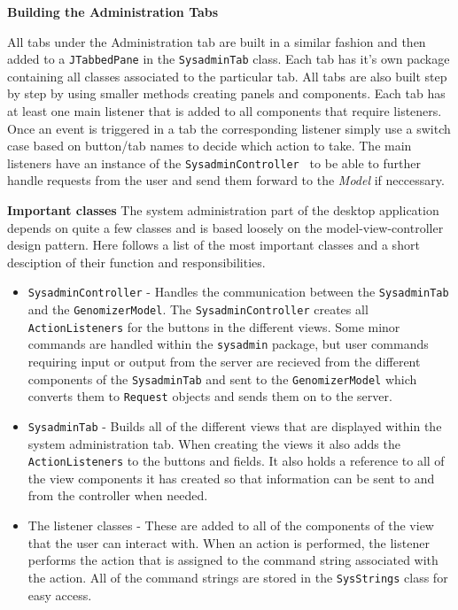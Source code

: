 \textbf{Building the Administration Tabs}


All tabs under the Administration tab are built in a similar fashion and then added to a
\texttt{JTabbedPane} in the \texttt{SysadminTab} class. Each tab has it’s own package containing 
all classes associated to the particular tab. All tabs are also built step by step by 
using smaller methods creating panels and components. Each tab has at least one main 
listener that is added to all components that require listeners. Once an event is triggered 
in a tab the corresponding listener simply use a switch case based on button/tab names 
to decide which action to take. The main listeners have an instance of the \texttt{SysadminController }
to be able to further handle requests from the user and send them forward to the \textit{Model} if neccessary.


\textbf{Important classes}
The system administration part of the desktop application depends on quite a few classes and is based loosely on the model-view-controller design pattern. Here follows a list of the most important classes and a short desciption of their function and responsibilities.
\begin{itemize}
\item \texttt{SysadminController} - Handles the communication between the \texttt{SysadminTab} and the \texttt{GenomizerModel}. The \texttt{SysadminController} creates all \texttt{ActionListeners} for the buttons in the different views. Some minor commands are handled within the \texttt{sysadmin} package, but user commands requiring input or output from the server are recieved from the different components of the \texttt{SysadminTab} and sent to the \texttt{GenomizerModel} which converts them to \texttt{Request} objects and sends them on to the server.
\item \texttt{SysadminTab} - Builds all of the different views that are displayed within the system administration tab. When creating the views it also adds the \texttt{ActionListeners} to the buttons and fields. It also holds a reference to all of the view components it has created so that information can be sent to and from the controller when needed.
\item The listener classes - These are added to all of the components of the view that the user can interact with. When an action is performed, the listener performs the action that is assigned to the command string associated with the action. All of the command strings are stored in the \texttt{SysStrings} class for easy access.
\end{itemize}



